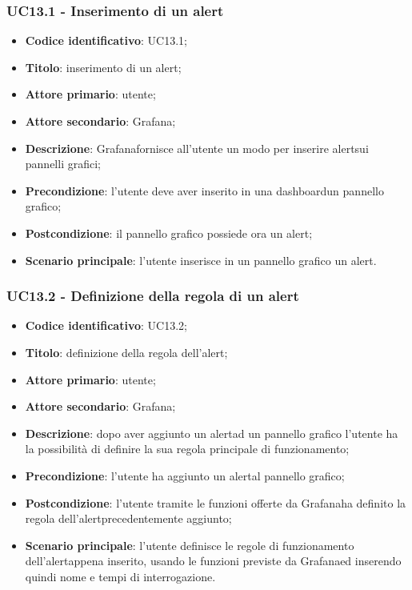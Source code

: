 \subsubsection{UC13.1 - Inserimento di un alert}
\begin{itemize}
	\item \textbf{Codice identificativo}: UC13.1;
	\item \textbf{Titolo}: inserimento di un alert\glo;
	\item \textbf{Attore primario}: utente;
	\item \textbf{Attore secondario}: Grafana\glo;
	\item \textbf{Descrizione}: Grafana\glosp fornisce all'utente un modo per inserire alert\glosp sui pannelli grafici;
	\item \textbf{Precondizione}: l'utente deve aver inserito in una dashboard\glosp un pannello grafico;
	\item \textbf{Postcondizione}: il pannello grafico possiede ora un alert\glo;
	\item \textbf{Scenario principale}: l'utente inserisce in un pannello grafico un alert\glo.
\end{itemize}

\subsubsection{UC13.2 - Definizione della regola di un alert}
\begin{itemize}
	\item \textbf{Codice identificativo}: UC13.2;
	\item \textbf{Titolo}: definizione della regola dell'alert\glo;
	\item \textbf{Attore primario}: utente;
	\item \textbf{Attore secondario}: Grafana\glo;
	\item \textbf{Descrizione}: dopo aver aggiunto un alert\glosp ad un pannello grafico l'utente ha la possibilità di definire la sua regola principale di funzionamento;
	\item \textbf{Precondizione}: l'utente ha aggiunto un alert\glosp al pannello grafico;
	\item \textbf{Postcondizione}: l'utente tramite le funzioni offerte da Grafana\glosp ha definito la regola dell'alert\glosp precedentemente aggiunto;
	\item \textbf{Scenario principale}: l'utente definisce le regole di funzionamento dell'alert\glosp appena inserito, usando le funzioni previste da Grafana\glosp ed inserendo quindi nome e tempi di interrogazione.
\end{itemize}


